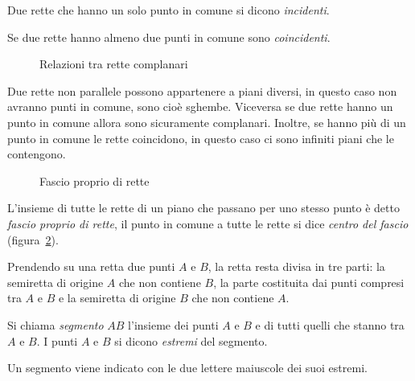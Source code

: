\begin{definizione}
Due rette che hanno un solo punto in comune si dicono 
\emph{incidenti}.
\end{definizione}

\begin{definizione}
Se due rette hanno almeno due punti in comune sono \emph{coincidenti}.
\end{definizione}


\begin{inaccessibleblock}
 \begin{figure}[hbt]
 \centering 
 \caption{Relazioni tra rette complanari}\label{fig:1.12}
\end{figure}
\end{inaccessibleblock}

\osservazione Due rette non parallele possono appartenere a piani 
diversi, in questo caso non avranno punti in comune, sono cioè 
sghembe. Viceversa se due rette hanno un punto in comune allora sono 
sicuramente complanari. Inoltre, se hanno più di un punto in comune 
le rette coincidono, in questo caso ci sono infiniti piani che le 
contengono. 


\begin{inaccessibleblock}
 \begin{figure}[!htb]
	\centering
	\caption{Fascio proprio di rette}\label{fig:1.16}
\end{figure}
\end{inaccessibleblock}

\begin{definizione}
L'insieme di tutte le rette di un piano che passano per uno stesso 
punto è detto \emph{fascio proprio di rette}, il punto in comune a 
tutte le rette si dice \emph{centro del fascio} 
(figura~\ref{fig:1.16}).
\end{definizione}

Prendendo su una retta due punti \(A\) e \(B\), la retta resta divisa in 
tre parti: la semiretta di origine \(A\) che non contiene \(B\), la parte 
costituita dai punti compresi tra \(A\) e \(B\) e la semiretta di origine 
\(B\) che non contiene \(A\).

\begin{definizione}
Si chiama \emph{segmento} \(AB\) l'insieme dei punti \(A\) e \(B\) e di 
tutti quelli che stanno tra \(A\) e \(B\).
I punti \(A\) e \(B\) si dicono \emph{estremi} del segmento.
\end{definizione}
Un segmento viene indicato con le due lettere maiuscole dei suoi 
estremi.

